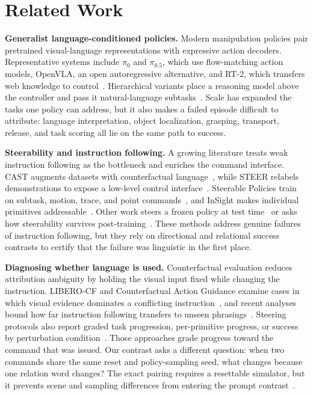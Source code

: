 \documentclass[letterpaper,10pt,conference]{ieeeconf}%
\newcommand{\tightparagraph}[1]{\vspace{0.25em}\noindent\textbf{#1}}
\begin{document}
\section{Related Work}
\label{sec:related}

\tightparagraph{Generalist language-conditioned policies.}
Modern manipulation policies pair pretrained visual-language representations with expressive action decoders.
Representative systems include $\pi_0$ and $\pi_{0.5}$, which use flow-matching action models, OpenVLA, an open autoregressive alternative, and RT-2, which transfers web knowledge to control~\cite{black2024pi0,black2025pi05,kim2024openvla,brohan2023rt2}.
Hierarchical variants place a reasoning model above the controller and pass it natural-language subtasks~\cite{shi2025hirobot}.
Scale has expanded the tasks one policy can address, but it also makes a failed episode difficult to attribute: language interpretation, object localization, grasping, transport, release, and task scoring all lie on the same path to success.

\tightparagraph{Steerability and instruction following.}
A growing literature treats weak instruction following as the bottleneck and enriches the command interface.
CAST augments datasets with counterfactual language~\cite{glossop2025cast}, while STEER relabels demonstrations to expose a low-level control interface~\cite{smith2025steer}.
Steerable Policies train on subtask, motion, trace, and point commands~\cite{chen2026steerable}, and InSight makes individual primitives addressable~\cite{wang2026insight}.
Other work steers a frozen policy at test time~\cite{jeong2026steering} or asks how steerability survives post-training~\cite{chen2026resteer,huang2026lockin}.
These methods address genuine failures of instruction following, but they rely on directional and relational success contrasts to certify that the failure was linguistic in the first place.

\tightparagraph{Diagnosing whether language is used.}
Counterfactual evaluation reduces attribution ambiguity by holding the visual input fixed while changing the instruction.
LIBERO-CF and Counterfactual Action Guidance examine cases in which visual evidence dominates a conflicting instruction~\cite{fang2026cag}, and recent analyses bound how far instruction following transfers to unseen phrasings~\cite{li2025confined}.
Steering protocols also report graded task progression, per-primitive progress, or success by perturbation condition~\cite{chen2026steerable,wang2026insight,jeong2026steering}.
Those approaches grade progress toward the command that was issued.
Our contrast asks a different question: when two commands share the same reset and policy-sampling seed, what changes because one relation word changes?
The exact pairing requires a resettable simulator, but it prevents scene and sampling differences from entering the prompt contrast~\cite{wang2026insight}.
\end{document}
